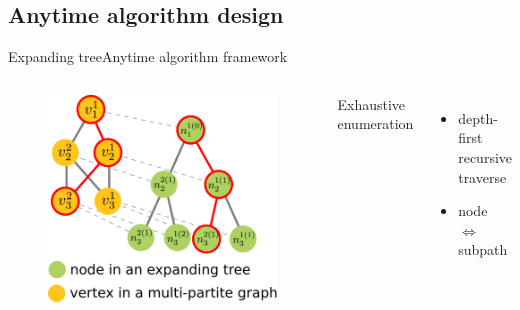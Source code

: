 \subsection{Anytime algorithm design}

\begin{frame}{Expanding tree}{Anytime algorithm framework}

\begin{columns}

\begin{minipage}{\textwidth}
\begin{figure}
\centering
\includegraphics[width=.9\textwidth]{./figure/multipartite_expandingtree}
\end{figure}
\end{minipage}


\begin{minipage}{\textwidth}

Exhaustive enumeration

\begin{itemize}
\item depth-first recursive traverse
\item node $ \Longleftrightarrow $ subpath
\end{itemize}
\end{minipage}

\end{columns}

\end{frame}

